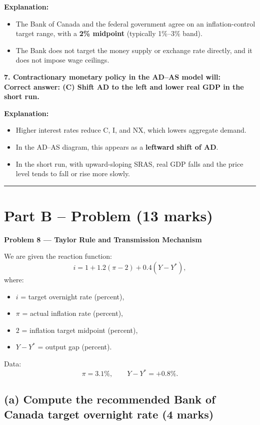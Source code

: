 \documentclass[12pt]{article}
\begin{document}
\textbf{Explanation:}
\begin{itemize}
    \item The Bank of Canada and the federal government agree on an inflation-control target range, with a \textbf{2\% midpoint} (typically 1\%--3\% band).
    \item The Bank does not target the money supply or exchange rate directly, and it does not impose wage ceilings.
\end{itemize}

\bigskip

\textbf{7. Contractionary monetary policy in the AD--AS model will:}\\
\textbf{Correct answer: (C) Shift AD to the left and lower real GDP in the short run.}

\textbf{Explanation:}
\begin{itemize}
    \item Higher interest rates reduce C, I, and NX, which lowers aggregate demand.
    \item In the AD--AS diagram, this appears as a \textbf{leftward shift of AD}.
    \item In the short run, with upward-sloping SRAS, real GDP falls and the price level tends to fall or rise more slowly.
\end{itemize}

\hrule
\vspace{1em}

\section*{Part B -- Problem (13 marks)}

\textbf{Problem 8 --- Taylor Rule and Transmission Mechanism}

We are given the reaction function:
\[
i = 1 + 1.2(\pi - 2) + 0.4(Y - Y^*),
\]
where:
\begin{itemize}
    \item \(i\) = target overnight rate (percent),
    \item \(\pi\) = actual inflation rate (percent),
    \item \(2\) = inflation target midpoint (percent),
    \item \(Y - Y^*\) = output gap (percent).
\end{itemize}

Data:
\[
\pi = 3.1\%, \qquad Y - Y^* = +0.8\%.
\]

\subsection*{(a) Compute the recommended Bank of Canada target overnight rate (4 marks)}
\end{document}
